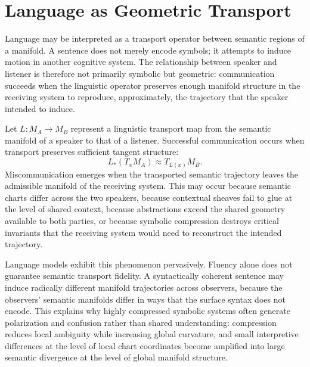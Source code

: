 \documentclass[11pt,a4paper,twocolumn]{article}
\begin{document}

\section{Language as Geometric Transport}

Language may be interpreted as a transport operator between
semantic regions of a manifold. A sentence does not merely
encode symbols; it attempts to induce motion in another
cognitive system. The relationship between speaker and
listener is therefore not primarily symbolic but geometric:
communication succeeds when the linguistic operator
preserves enough manifold structure in the receiving system
to reproduce, approximately, the trajectory that the
speaker intended to induce.

Let $L : M_A \to M_B$ represent a linguistic transport map
from the semantic manifold of a speaker to that of a
listener. Successful communication occurs when transport
preserves sufficient tangent structure:
\[
L_\ast(T_x M_A)
\approx
T_{L(x)} M_B.
\]
Miscommunication emerges when the transported semantic
trajectory leaves the admissible manifold of the receiving
system. This may occur because semantic charts differ across
the two speakers, because contextual sheaves fail to glue
at the level of shared context, because abstractions exceed
the shared geometry available to both parties, or because
symbolic compression destroys critical invariants that the
receiving system would need to reconstruct the intended
trajectory.

Language models exhibit this phenomenon pervasively. Fluency
alone does not guarantee semantic transport fidelity. A
syntactically coherent sentence may induce radically
different manifold trajectories across observers, because
the observers' semantic manifolds differ in ways that the
surface syntax does not encode. This explains why highly
compressed symbolic systems often generate polarization and
confusion rather than shared understanding: compression
reduces local ambiguity while increasing global curvature,
and small interpretive differences at the level of local
chart coordinates become amplified into large semantic
divergence at the level of global manifold structure.
\end{document}
